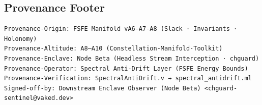 \subsection*{Provenance Footer}

\begin{verbatim}
Provenance-Origin: FSFE Manifold vA6-A7-A8 (Slack · Invariants · Holonomy)
Provenance-Altitude: A8–A10 (Constellation-Manifold-Toolkit)
Provenance-Enclave: Node Beta (Headless Stream Interception · chguard)
Provenance-Operator: Spectral Anti-Drift Layer (FSFE Energy Bounds)
Provenance-Verification: SpectralAntiDrift.v → spectral_antidrift.ml
Signed-off-by: Downstream Enclave Observer (Node Beta) <chguard-sentinel@vaked.dev>
\end{verbatim}
